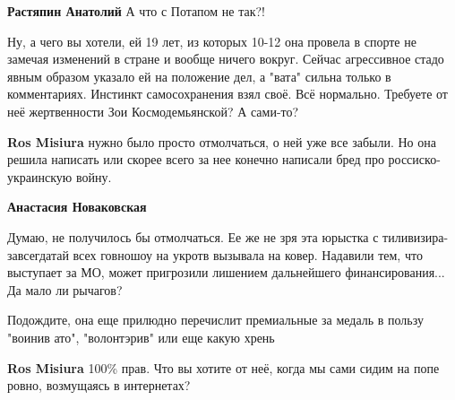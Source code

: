 \begin{itemize}
\begin{itemize}

 
\textbf{Растяпин Анатолий} А что с Потапом не так?!
\end{itemize}


Ну, а чего вы хотели, ей 19 лет, из которых 10-12 она провела в спорте не
замечая изменений в стране и вообще ничего вокруг. Сейчас агрессивное стадо
явным образом указало ей на положение дел, а "вата" сильна только в
комментариях. Инстинкт самосохранения взял своё. Всё нормально. Требуете от неё
жертвенности Зои Космодемьянской? А сами-то?

\begin{itemize}

 
\textbf{Ros Misiura} нужно было просто отмолчаться, о ней уже все забыли. Но
она решила написать или скорее всего за нее конечно написали бред про россиско-
украинскую войну.


\textbf{Анастасия Новаковская} 

Думаю, не получилось бы отмолчаться. Ее же не зря эта юрыстка с
тиливизира-завсегдатай всех говношоу на укротв вызывала на ковер. Надавили тем,
что выступает за МО, может пригрозили лишением дальнейшего финансирования... Да
мало ли рычагов?

Подождите, она еще прилюдно перечислит премиальные за медаль в пользу "воинив
ато", "волонтэрив" или еще какую хрень

 
\textbf{Ros Misiura} 100\% прав. Что вы хотите от неё, когда мы сами сидим на попе ровно, возмущаясь в интернетах?

\end{itemize}



\end{itemize}

